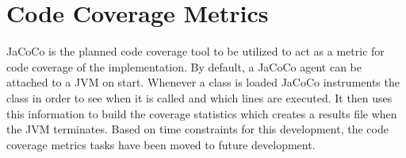 \documentclass[12pt, titlepage]{article}
\begin{document}
\section{Code Coverage Metrics}
JaCoCo is the planned code coverage tool to be utilized to act as a metric for code coverage of the implementation. By default, a JaCoCo agent can be attached to a JVM on start. Whenever a class is loaded JaCoCo instruments the class in order to see when it is called and which lines are executed. It then uses this information to build the coverage statistics which creates a results file when the JVM terminates. Based on time constraints for this development, the code coverage metrics tasks have been moved to future development.

%

%
\end{document}
